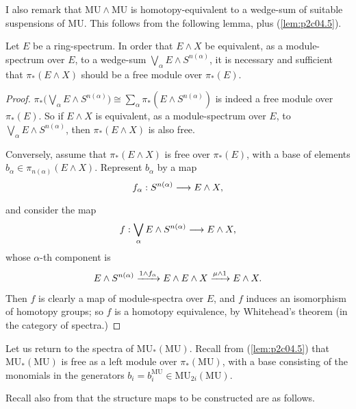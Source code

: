 \documentclass[../main]{subfiles}
\begin{document}
I also remark that $\mathrm{MU} \wedge \mathrm{MU}$ is homotopy-equivalent to a wedge-sum of suitable suspensions of $\mathrm{MU}$. This follows from the following lemma, plus (\ref{lem:p2c04.5}).
\begin{lemma}
\label{lem:p2c11.1}
Let $E$ be a ring-spectrum. In order that $E \wedge X$ be equivalent, as a module-spectrum over $E$, to a wedge-sum $\displaystyle \bigvee_\alpha E \wedge S^{n(\alpha)}$, it is necessary and sufficient that $\pi_\ast(E \wedge X)$ should be a free module over $\pi_\ast(E)$.
\end{lemma}

\begin{proof}
$\displaystyle \pi_\ast \bigg(\bigvee_\alpha E \wedge S^{n(\alpha)}\bigg) \cong \sum_\alpha \pi_\ast(E \wedge S^{n(\alpha)})$ is indeed a free module over $\pi_\ast(E)$. So if $E \wedge X$ is equivalent, as a module-spectrum over $E$, to $\displaystyle \bigvee_\alpha E \wedge S^{n(\alpha)}$, then $\pi_\ast(E \wedge X)$ is also free.

Conversely, assume that $\pi_\ast(E \wedge X)$ is free over $\pi_\ast(E)$, with a base of elements $b_\alpha \in \pi_{n(\alpha)} (E \wedge X)$. Represent $b_\alpha$ by a map \[f_\alpha : S^{n(\alpha)} \lar{} E \wedge X,\] and consider the map \[\displaystyle f : \bigvee_\alpha E \wedge S^{n(\alpha)} \lar{} E \wedge X,\] whose $\alpha$-th component is \[E \wedge S^{n(\alpha)} \lar{1 \wedge f_\alpha} E \wedge E \wedge X \lar{\mu \wedge 1} E \wedge X.\] Then $f$ is clearly a map of module-spectra over $E$, and $f$ induces an isomorphism of homotopy groups; so $f$ is a homotopy equivalence, by Whitehead's theorem (in the category of spectra.) 
\end{proof}

Let us return to the spectra of $\mathrm{MU}_\ast(\mathrm{MU})$. Recall from (\ref{lem:p2c04.5}) that $\mathrm{MU}_\ast(\mathrm{MU})$ is free as a left module over $\pi_\ast(\mathrm{MU})$, with a base consisting of the monomials in the generators $b_i = b_i^{\mathrm{MU}} \in \mathrm{MU}_{2i}(\mathrm{MU})$.

Recall also from \cite[p.~61]{adams3} that the structure maps to be constructed are as follows. 
\end{document}
